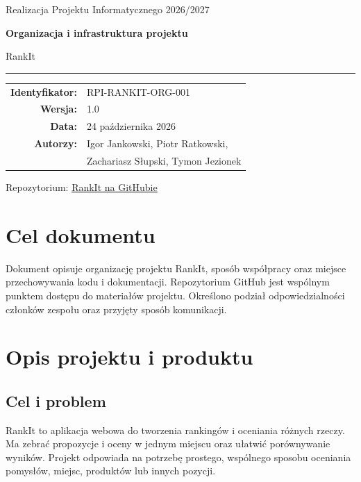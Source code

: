 \documentclass[11pt,a4paper]{article}
\begin{document}
\begin{titlepage}
  \centering
  \vspace*{2.2cm}
  {\Huge\RankItWordmark\par}
  \vspace{0.7cm}
  {\Large Realizacja Projektu Informatycznego 2026/2027\par}
  \vspace{1.7cm}
  {\huge\bfseries\color{RankItNavy}Organizacja i infrastruktura projektu\par}
  \vspace{0.45cm}
  {\LARGE RankIt\par}
  \vspace{0.8cm}
  {\color{RankItTeal}\rule{0.72\textwidth}{1.5pt}\par}
  \vspace{1.3cm}
  \begin{tabular}{rl}
    \textbf{Identyfikator:} & RPI-RANKIT-ORG-001 \\
    \textbf{Wersja:} & 1.0 \\
    \textbf{Data:} & 24 października 2026 \\
    \textbf{Autorzy:} & Igor Jankowski, Piotr Ratkowski, \\
    & Zachariasz Słupski, Tymon Jezionek \\
  \end{tabular}
  \vfill
  {\large\textcolor{RankItNavy}{Repozytorium:} \href{https://github.com/elprofesoriqo/rpi}{RankIt na GitHubie}\par}
\end{titlepage}

\tableofcontents
\clearpage
{}
\setcounter{page}{2}

\section*{Cel dokumentu}
Dokument opisuje organizację projektu RankIt, sposób współpracy oraz miejsce przechowywania kodu i dokumentacji. Repozytorium GitHub jest wspólnym punktem dostępu do materiałów projektu. Określono podział odpowiedzialności członków zespołu oraz przyjęty sposób komunikacji.

\section{Opis projektu i produktu}
\subsection{Cel i problem}
RankIt to aplikacja webowa do tworzenia rankingów i oceniania różnych rzeczy. Ma zebrać propozycje i oceny w jednym miejscu oraz ułatwić porównywanie wyników. Projekt odpowiada na potrzebę prostego, wspólnego sposobu oceniania pomysłów, miejsc, produktów lub innych pozycji.
\end{document}
